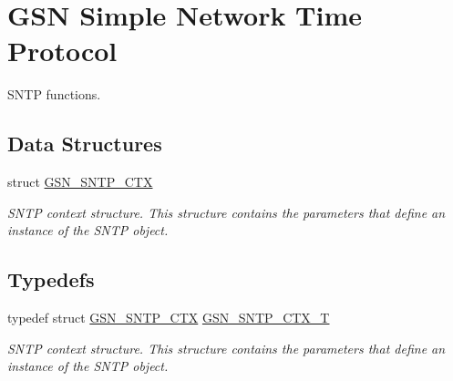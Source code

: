 \hypertarget{a00672}{
\section{GSN Simple Network Time Protocol}
\label{a00672}
}


SNTP functions.  


\subsection*{Data Structures}
\begin{DoxyCompactItemize}
\item 
struct \hyperlink{a00227}{GSN\_\-SNTP\_\-CTX}
\begin{DoxyCompactList}\small\item\em SNTP context structure. This structure contains the parameters that define an instance of the SNTP object. \end{DoxyCompactList}\end{DoxyCompactItemize}
\subsection*{Typedefs}
\begin{DoxyCompactItemize}
\item 
typedef struct \hyperlink{a00227}{GSN\_\-SNTP\_\-CTX} \hyperlink{a00672_gae0179c63a9e6988c361e8d0deb285a24}{GSN\_\-SNTP\_\-CTX\_\-T}
\begin{DoxyCompactList}\small\item\em SNTP context structure. This structure contains the parameters that define an instance of the SNTP object. \end{DoxyCompactList}\end{DoxyCompactItemize}
